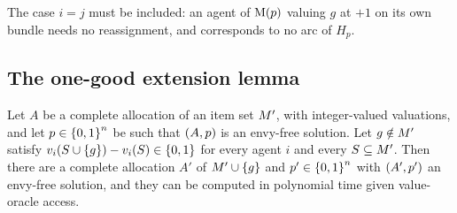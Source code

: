 The case $i=j$ must be included: an agent of $\mathrm{M}(p)$ valuing $g$ at $+1$
on its own bundle needs no reassignment, and corresponds to no arc of $H_p$.

\subsection{The one-good extension lemma}

\begin{lemma}
\label{lem:os-extension}
Let $A$ be a complete allocation of an item set $M'$, with integer-valued
valuations, and let $p\in\left\{0,1\right\}^n$ be such that $(A,p)$ is an
envy-free solution. Let $g\notin M'$ satisfy
$v_i(S\cup\left\{g\right\})-v_i(S)\in\left\{0,1\right\}$ for every agent $i$ and every
$S\subseteq M'$. Then there are a complete allocation $A'$ of
$M'\cup\left\{g\right\}$ and $p'\in\left\{0,1\right\}^n$ with $(A',p')$ an
envy-free solution, and they can be computed in polynomial time given
value-oracle access.
\end{lemma}

